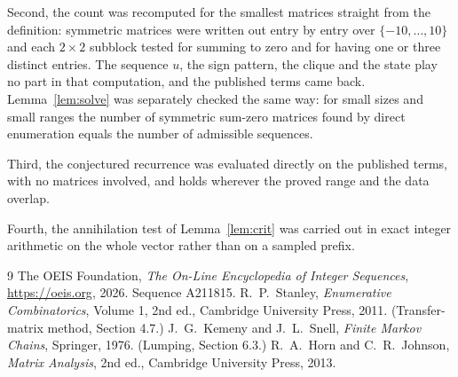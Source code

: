 \documentclass[11pt,a4paper]{article}
\theoremstyle{plain}
\theoremstyle{definition}
\begin{document}
Second, the count was recomputed for the smallest matrices straight from the definition:
symmetric matrices were written out entry by entry over $\{-10,\dots,10\}$ and each
$2\times2$ subblock tested for summing to zero and for having one or three distinct entries. The
sequence $u$, the sign pattern, the clique and the state play no part in that computation, and
the published terms came back. Lemma~\ref{lem:solve} was separately checked the same way: for
small sizes and small ranges the number of symmetric sum-zero matrices found by direct
enumeration equals the number of admissible sequences.

Third, the conjectured recurrence was evaluated directly on the published terms, with no
matrices involved, and holds wherever the proved range and the data overlap.

Fourth, the annihilation test of Lemma~\ref{lem:crit} was carried out in exact integer
arithmetic on the whole vector rather than on a sampled prefix.

\begin{thebibliography}{9}
 The OEIS Foundation, \emph{The On-Line Encyclopedia of Integer
Sequences}, \url{https://oeis.org}, 2026. Sequence A211815.
 R.~P.~Stanley, \emph{Enumerative Combinatorics}, Volume 1, 2nd ed.,
Cambridge University Press, 2011. (Transfer-matrix method, Section 4.7.)
 J.~G.~Kemeny and J.~L.~Snell, \emph{Finite Markov Chains}, Springer, 1976.
(Lumping, Section 6.3.)
 R.~A.~Horn and C.~R.~Johnson, \emph{Matrix Analysis}, 2nd ed., Cambridge
University Press, 2013.
\end{thebibliography}
\end{document}
